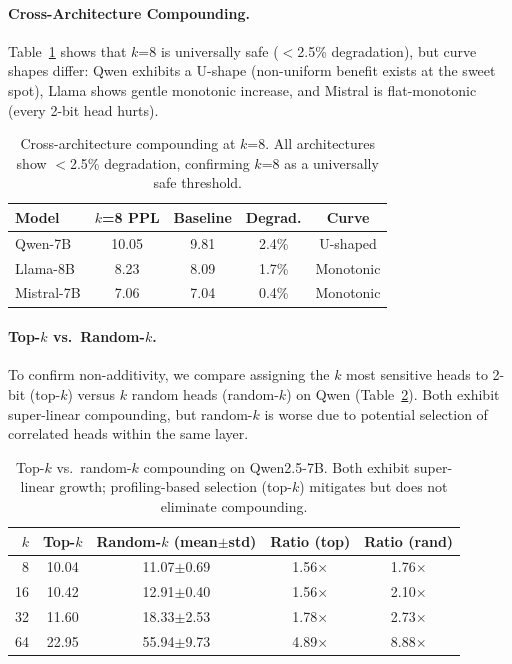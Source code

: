 \documentclass[11pt,a4paper]{article}
\begin{document}
\paragraph{Cross-Architecture Compounding.}
Table~\ref{tab:cross_compound} shows that $k$=8 is universally safe ($<$2.5\% degradation), but curve shapes differ:
Qwen exhibits a U-shape (non-uniform benefit exists at the sweet spot),
Llama shows gentle monotonic increase,
and Mistral is flat-monotonic (every 2-bit head hurts).

\begin{table}[t]
\centering
\small
\caption{Cross-architecture compounding at $k$=8. All architectures show $<$2.5\% degradation, confirming $k$=8 as a universally safe threshold.}
\label{tab:cross_compound}
\begin{tabular}{@{}lcccc@{}}
\toprule
\textbf{Model} & \textbf{$k$=8 PPL} & \textbf{Baseline} & \textbf{Degrad.} & \textbf{Curve} \\
\midrule
Qwen-7B & 10.05 & 9.81 & 2.4\% & U-shaped \\
Llama-8B & 8.23 & 8.09 & 1.7\% & Monotonic \\
Mistral-7B & 7.06 & 7.04 & 0.4\% & Monotonic \\
\bottomrule
\end{tabular}
\end{table}

\paragraph{Top-$k$ vs.\ Random-$k$.}
To confirm non-additivity, we compare assigning the $k$ most sensitive heads to 2-bit (top-$k$) versus $k$ random heads (random-$k$) on Qwen (Table~\ref{tab:topk_vs_random}).
Both exhibit super-linear compounding, but random-$k$ is worse due to potential selection of correlated heads within the same layer.

\begin{table}[t]
\centering
\small
\caption{Top-$k$ vs.\ random-$k$ compounding on Qwen2.5-7B. Both exhibit super-linear growth; profiling-based selection (top-$k$) mitigates but does not eliminate compounding.}
\label{tab:topk_vs_random}
\begin{tabular}{@{}rcccc@{}}
\toprule
$k$ & Top-$k$ & Random-$k$ (mean$\pm$std) & Ratio (top) & Ratio (rand) \\
\midrule
8 & 10.04 & 11.07$\pm$0.69 & 1.56$\times$ & 1.76$\times$ \\
16 & 10.42 & 12.91$\pm$0.40 & 1.56$\times$ & 2.10$\times$ \\
32 & 11.60 & 18.33$\pm$2.53 & 1.78$\times$ & 2.73$\times$ \\
64 & 22.95 & 55.94$\pm$9.73 & 4.89$\times$ & 8.88$\times$ \\
\bottomrule
\end{tabular}
\end{table}
\end{document}
